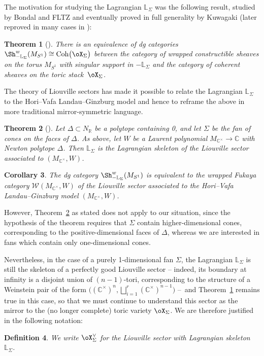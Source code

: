 \documentclass[pdftex]{sigma}%
\numberwithin{equation}{section}
\newtheorem{Theorem}{Theorem}[section]
\newtheorem{Corollary}[Theorem]{Corollary}
\newtheorem{Definition}[Theorem]{Definition}
\def\CC{\mathbb{C}}
\def\LL{\mathbb{L}}
\def\RR{\mathbb{R}}
\def\cW{\mathcal{W}}
\newcommand{\Coh}{\textup{Coh}}
\begin{document}
The motivation for studying the Lagrangian $\LL_\Sigma$ was the following result, studied by Bondal and FLTZ and eventually proved in full generality by Kuwagaki (later reproved in many cases in \cite{Zhou-ccc}):
\begin{Theorem}[\cite{Ku}]\label{thm:ccc}
 There is an equivalence of dg categories $\Sh^w_{-\LL_\Sigma}(M_{S^1})\cong\Coh\big(\oX_\Sigma\big)$ between the category of wrapped constructible sheaves on the torus $M_{S^1}$ with singular support in $-\LL_\Sigma$ and the category of coherent sheaves on the toric stack~$\oX_\Sigma$.
\end{Theorem}

The theory of Liouville sectors has made it possible to relate the Lagrangian $\LL_\Sigma$ to the Hori--Vafa Landau--Ginzburg model and hence to reframe the above in more traditional mirror-symmetric language.
\begin{Theorem}[\cite{GS17,Zhou-skel}]\label{thm:hv-skel}
 Let $\Delta\subset N_\RR$ be a polytope containing 0, and let $\Sigma$ be the fan of cones on the faces of $\Delta$. As above, let $W$ be a Laurent polynomial $M_{\CC^\times}\to \CC$ with Newton polytope $\Delta$.
 Then $\LL_\Sigma$ is the Lagrangian skeleton of the Liouville sector associated to $(M_{\CC^\times},W)$.
\end{Theorem}

{\sloppy\begin{Corollary}
 The dg category $\Sh^w_{-\LL_\Sigma}(M_{S^1})$ is equivalent to the wrapped Fukaya category $\cW(M_{\CC^\times}, W)$ of the Liouville sector associated to the Hori--Vafa Landau--Ginzburg model $(M_{\CC^\times}, W)$.
\end{Corollary}}

However, Theorem~\ref{thm:hv-skel} as stated does not apply to our situation, since the hypothesis of the theorem requires that $\Sigma$ contain higher-dimensional cones, corresponding to the positive-dimensional faces of $\Delta$, whereas we are interested in fans which contain only one-dimensional cones.

Nevertheless, in the case of a purely 1-dimensional fan $\Sigma$, the Lagrangian $\LL_\Sigma$ is still the skeleton of a perfectly good Liouville sector -- indeed, its boundary at infinity is a disjoint union of $(n{-}1)$-tori, corresponding to the structure of a Weinstein pair of the form $\big((\CC^\times)^n,\bigsqcup_{i=1}^r(\CC^\times)^{n-1}\big)$ --~and Theorem~\ref{thm:ccc} remains true in this case, so that we must continue to understand this sector as the mirror to the (no longer complete) toric variety $\oX_\Sigma$. We are therefore justified in the following notation:
\begin{Definition}\label{defn:mirrorsec}
We write $\oX_\Sigma^\vee$ for the Liouville sector with Lagrangian skeleton $\LL_\Sigma$.
\end{Definition}
\end{document}
